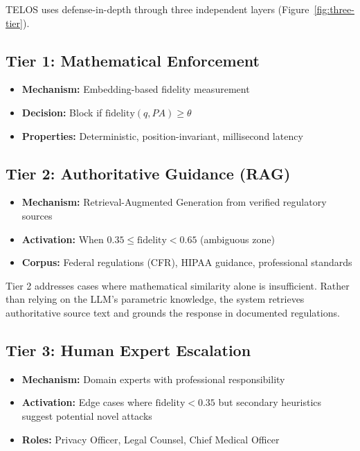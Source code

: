 \documentclass[11pt,twocolumn]{article}
\begin{document}
TELOS uses defense-in-depth through three independent layers (Figure~\ref{fig:three-tier}).

\subsection{Tier 1: Mathematical Enforcement}

\begin{itemize}
    \item \textbf{Mechanism:} Embedding-based fidelity measurement
    \item \textbf{Decision:} Block if $\text{fidelity}(q, PA) \geq \theta$
    \item \textbf{Properties:} Deterministic, position-invariant, millisecond latency
\end{itemize}

\subsection{Tier 2: Authoritative Guidance (RAG)}

\begin{itemize}
    \item \textbf{Mechanism:} Retrieval-Augmented Generation from verified regulatory sources
    \item \textbf{Activation:} When $0.35 \leq \text{fidelity} < 0.65$ (ambiguous zone)
    \item \textbf{Corpus:} Federal regulations (CFR), HIPAA guidance, professional standards
\end{itemize}

Tier 2 addresses cases where mathematical similarity alone is insufficient. Rather than relying on the LLM's parametric knowledge, the system retrieves authoritative source text and grounds the response in documented regulations.

\subsection{Tier 3: Human Expert Escalation}

\begin{itemize}
    \item \textbf{Mechanism:} Domain experts with professional responsibility
    \item \textbf{Activation:} Edge cases where $\text{fidelity} < 0.35$ but secondary heuristics suggest potential novel attacks
    \item \textbf{Roles:} Privacy Officer, Legal Counsel, Chief Medical Officer
\end{itemize}
\end{document}
